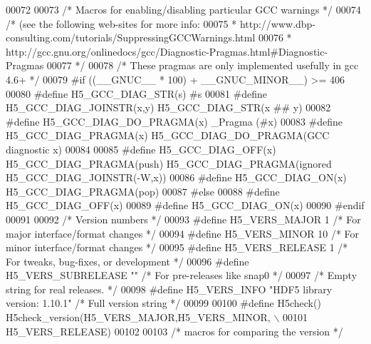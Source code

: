 \begin{DoxyCode}
00072 
00073 \textcolor{comment}{/* Macros for enabling/disabling particular GCC warnings */}
00074 \textcolor{comment}{/* (see the following web-sites for more info:}
00075 \textcolor{comment}{ *      http://www.dbp-consulting.com/tutorials/SuppressingGCCWarnings.html}
00076 \textcolor{comment}{ *      http://gcc.gnu.org/onlinedocs/gcc/Diagnostic-Pragmas.html#Diagnostic-Pragmas}
00077 \textcolor{comment}{ */}
00078 \textcolor{comment}{/* These pragmas are only implemented usefully in gcc 4.6+ */}
00079 \textcolor{preprocessor}{#if ((\_\_GNUC\_\_ * 100) + \_\_GNUC\_MINOR\_\_) >= 406}
00080 \textcolor{preprocessor}{    #define H5\_GCC\_DIAG\_STR(s) #s}
00081 \textcolor{preprocessor}{    #define H5\_GCC\_DIAG\_JOINSTR(x,y) H5\_GCC\_DIAG\_STR(x ## y)}
00082 \textcolor{preprocessor}{    #define H5\_GCC\_DIAG\_DO\_PRAGMA(x) \_Pragma (#x)}
00083 \textcolor{preprocessor}{    #define H5\_GCC\_DIAG\_PRAGMA(x) H5\_GCC\_DIAG\_DO\_PRAGMA(GCC diagnostic x)}
00084 
00085 \textcolor{preprocessor}{    #define H5\_GCC\_DIAG\_OFF(x) H5\_GCC\_DIAG\_PRAGMA(push) H5\_GCC\_DIAG\_PRAGMA(ignored
       H5\_GCC\_DIAG\_JOINSTR(-W,x))}
00086 \textcolor{preprocessor}{    #define H5\_GCC\_DIAG\_ON(x) H5\_GCC\_DIAG\_PRAGMA(pop)}
00087 \textcolor{preprocessor}{#else}
00088 \textcolor{preprocessor}{    #define H5\_GCC\_DIAG\_OFF(x)}
00089 \textcolor{preprocessor}{    #define H5\_GCC\_DIAG\_ON(x)}
00090 \textcolor{preprocessor}{#endif}
00091 
00092 \textcolor{comment}{/* Version numbers */}
00093 \textcolor{preprocessor}{#define H5\_VERS\_MAJOR   1   }\textcolor{comment}{/* For major interface/format changes        */}\textcolor{preprocessor}{}
00094 \textcolor{preprocessor}{#define H5\_VERS\_MINOR   10  }\textcolor{comment}{/* For minor interface/format changes        */}\textcolor{preprocessor}{}
00095 \textcolor{preprocessor}{#define H5\_VERS\_RELEASE 1   }\textcolor{comment}{/* For tweaks, bug-fixes, or development     */}\textcolor{preprocessor}{}
00096 \textcolor{preprocessor}{#define H5\_VERS\_SUBRELEASE ""   }\textcolor{comment}{/* For pre-releases like snap0       */}\textcolor{preprocessor}{}
00097                 \textcolor{comment}{/* Empty string for real releases.           */}
00098 \textcolor{preprocessor}{#define H5\_VERS\_INFO    "HDF5 library version: 1.10.1"      }\textcolor{comment}{/* Full version string */}\textcolor{preprocessor}{}
00099 
00100 \textcolor{preprocessor}{#define H5check()   H5check\_version(H5\_VERS\_MAJOR,H5\_VERS\_MINOR,          \(\backslash\)}
00101 \textcolor{preprocessor}{                        H5\_VERS\_RELEASE)}
00102 
00103 \textcolor{comment}{/* macros for comparing the version */}

\end{DoxyCode}
